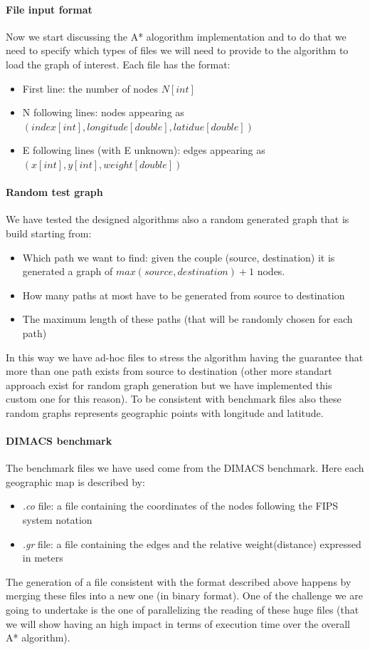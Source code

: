 \documentclass[twocolumn, switch]{article} %
\begin{document}
\paragraph{File input format} 
Now we start discussing the A* alogorithm implementation and to do that we need to specify which 
types of files we will need to provide to the algorithm to load the graph of interest. Each file has 
the format:
\begin{itemize}
    \item First line: the number of nodes $N[int]$
    \item N following lines: nodes appearing as $(index[int], longitude[double], latidue[double])$
    \item E following lines (with E unknown): edges appearing as $(x[int], y[int], weight[double])$
\end{itemize}
\paragraph{Random test graph} We have tested the designed algorithms also a random generated graph that
is build starting from: 
\begin{itemize}
  \item Which path we want to find: given the couple (source, destination) it is generated a graph of
        $max(source, destination) + 1$ nodes.
  \item How many paths at most have to be generated from source to destination
  \item The maximum length of these paths (that will be randomly chosen for each path)
\end{itemize}
In this way we have ad-hoc files to stress the algorithm having the guarantee that more than one path
exists from source to destination (other more standart approach exist for random graph generation but we
have implemented this custom one for this reason). To be consistent with benchmark files also these
random graphs represents geographic points with longitude and latitude.
\paragraph{DIMACS benchmark} 
The benchmark files we have used come from the DIMACS benchmark. Here each geographic map is described by:
\begin{itemize}
  \item \textit{.co} file: a file containing the coordinates of the nodes following the FIPS system notation
  \item \textit{.gr} file: a file containing the edges and the relative weight(distance) expressed in meters
\end{itemize}
The generation of a file consistent with the format described above happens by merging these files 
into a new one (in binary format). One of the challenge we are going to undertake is the one of
parallelizing the reading of these huge files (that we will show having an high impact in terms of
execution time over the overall A* algorithm).
\end{document}
